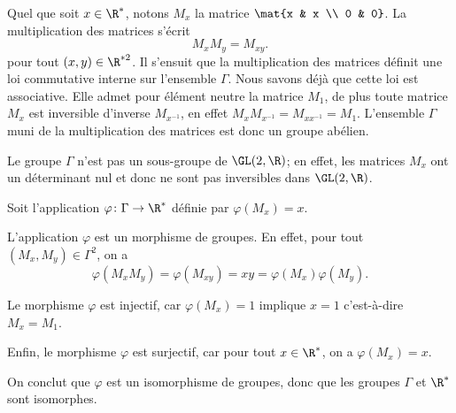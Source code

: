 Quel que soit $x\in\R^*$, notons $M_x$ la matrice $\mat{x & x \\ 0 & 0}$.
La multiplication des matrices s'écrit
\[
  M_xM_y = M_{xy}.
\]
pour tout $(x,y)\in\R^{*2}$. Il s'ensuit que la multiplication des matrices
définit une loi commutative interne sur l'ensemble $\Gamma$. Nous savons déjà
que cette loi est associative.  Elle admet pour élément neutre la matrice $M_1$,
de plus toute matrice $M_x$ est inversible d'inverse $M_{x^{-1}}$, en effet $M_x
M_{x^{-1}} = M_{x x^{-1}} = M_1$.  L'ensemble $\Gamma$ muni de la
multiplication des matrices est donc un groupe abélien.

Le groupe $\Gamma$ n'est pas un sous-groupe de $\GL(2,\R)$; en effet, les
matrices $M_x$ ont un déterminant nul et donc ne sont pas inversibles dans
$\GL(2,\R)$.

Soit l'application $\varphi\colon\Gamma\rightarrow\R^*$ définie par
$\varphi(M_x) = x$. 

L'application $\varphi$ est un morphisme de groupes. En effet, pour tout 
$(M_x,M_y)\in\Gamma^2$, on a
\[
  \varphi(M_x M_y) = \varphi(M_{xy}) = xy = \varphi(M_x)\varphi(M_y).
\]

Le morphisme $\varphi$ est injectif, car $\varphi(M_x) = 1$ implique $x=1$
c'est-à-dire $M_x = M_1$. 

Enfin, le morphisme $\varphi$ est surjectif, car pour tout $x\in\R^*$, on a
$\varphi(M_x) = x$.

On conclut que $\varphi$ est un isomorphisme de groupes, donc que les groupes
$\Gamma$ et $\R^*$ sont isomorphes.


